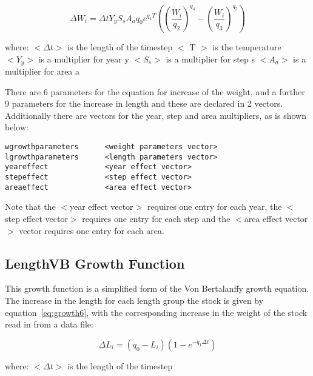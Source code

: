 \documentclass [a4paper, 10pt]{book}
\begin{document}
\begin{equation}\label{eq:growth5w}
\Delta W_{i} = \Delta t Y_{y} S_{s} A_{a} q_{0} e^{q_{1}T}\left(
\left( \frac{W_{i}}{q_{2}} \right)^{q_{4}} -
\left( \frac{W_{i}}{q_{3}} \right)^{q_{5}} \right)
\end{equation}

where:\newline
$<\Delta t>$ is the length of the timestep\newline
$<$ T $>$ is the temperature\newline
$<Y_{y}>$ is a multiplier for year y\newline
$<S_{s}>$ is a multiplier for step s\newline
$<A_{a}>$ is a multiplier for area a

\bigskip
There are 6 parameters for the equation for increase of the weight, and a further 9 parameters for the increase in length and these are declared in 2 vectors.  Additionally there are vectors for the year, step and area multipliers, as is shown below:

{\small\begin{verbatim}
wgrowthparameters      <weight parameters vector>
lgrowthparameters      <length parameters vector>
yeareffect             <year effect vector>
stepeffect             <step effect vector>
areaeffect             <area effect vector>
\end{verbatim}}

Note that the $<$year effect vector$>$ requires one entry for each year, the $<$step effect vector$>$ requires one entry for each step and the $<$area effect vector$>$ vector requires one entry for each area.

\newpage %
\subsection{LengthVB Growth Function}\label{subsec:growth6}
This growth function is a simplified form of the Von Bertalanffy growth equation.  The increase in the length for each length group the stock is given by equation~\ref{eq:growth6}, with the corresponding increase in the weight of the stock read in from a data file:

\begin{equation}\label{eq:growth6}
\Delta L_{i} = \left( q_{0} - L_{i} \right) \left( 1 - e^{-q_{1} \Delta t} \right)
\end{equation}

where:\newline
$<\Delta t>$ is the length of the timestep
\end{document}
